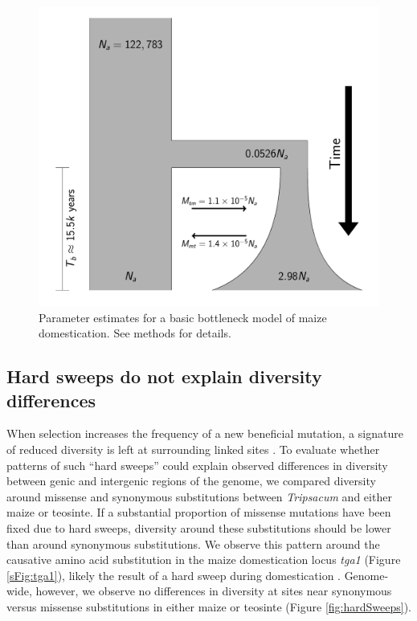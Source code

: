 \documentclass[12pt,a4paper]{article}
\newcommand{\mbh}[1]{\textcolor{blue}{\scriptsize #1}}
\begin{document}
\begin{figure}[!tb]
\centering
\includegraphics[width=.5\textwidth]{FigsAndFiles/DomesticationModel/domesticationModel.pdf}
\caption{Parameter estimates for a basic bottleneck model of maize domestication. See methods for details. \label{fig:bottleneck} }
\end{figure}


\subsection*{Hard sweeps do not explain diversity differences} %
When selection increases the frequency of a new beneficial mutation, a signature of reduced diversity is left at surrounding linked sites \cite{smith1974}.
To evaluate whether patterns of such ``hard sweeps'' could explain observed differences in diversity between genic and intergenic regions of the genome, we compared diversity around missense and synonymous substitutions between \emph{Tripsacum} and either maize or teosinte.
If a substantial proportion of missense mutations have been fixed due to hard sweeps, diversity around these substitutions should be lower than around synonymous substitutions. 
We observe this pattern around the causative amino acid substitution in the maize domestication locus \emph{tga1} (Figure \ref{sFig:tga1}), likely the result of a hard sweep during domestication \cite{wang2005, wang2015}. Genome-wide, however, we observe no differences in diversity at sites near synonymous versus missense substitutions in either maize or teosinte (Figure \ref{fig:hardSweeps}).

\end{document}
